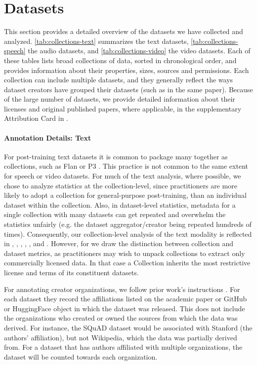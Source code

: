 \section{Datasets}
\label{app:datasets}
This section provides a detailed overview of the datasets we have collected and analyzed. \autoref{tab:collections-text} summarizes the text datasets, \autoref{tab:collections-speech} the audio datasets, and \autoref{tab:collections-video} the video datasets. Each of these tables lists broad collections of data, sorted in chronological order, and provides information about their properties, sizes, sources and permissions. Each collection can include multiple datasets, and they generally reflect the ways dataset creators have grouped their datasets (such as in the same paper). Because of the large number of datasets, we provide detailed information about their licenses and original published papers, where applicable, in the supplementary Attribution Card in .

\paragraph{Annotation Details: Text}
For post-training text datasets it is common to package many together as collections, such as Flan \citep{weifinetuned} or P3 \citep{sanh2021multitask}. 
This practice is not common to the same extent for speech or video datasets.
For much of the text analysis, where possible, we chose to analyze statistics at the collection-level, since practitioners are more likely to adopt a collection for general-purpose post-training, than an individual dataset within the collection.
Also, in dataset-level statistics, metadata for a single collection with many datasets can get repeated and overwhelm the statistics unfairly (e.g. the dataset aggregator/creator being repeated hundreds of times).
Consequently, our collection-level analysis of the text modality is reflected in  , , , , , and .
However, for  we draw the distinction between collection and dataset metrics, as practitioners may wish to unpack collections to extract only commercially licensed data.
In that case a Collection inherits the most restrictive license and terms of its constituent datasets.

For annotating creator organizations, we follow prior work's instructions \citep{longpre2023data}.
For each dataset they record the affiliations listed on the academic paper or GitHub or HuggingFace object in which the dataset was released.
This does not include the organizations who created or owned the sources from which the data was derived.
For instance, the SQuAD dataset \citep{rajpurkar2016squad} would be associated with Stanford (the authors' affiliation), but not Wikipedia, which the data was partially derived from.
For a dataset that has authors affiliated with multiple organizations, the dataset will be counted towards each organization.

